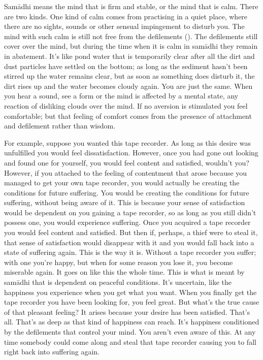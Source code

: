 Sam\=adhi means the mind that is firm and stable, or the mind that is calm. There are two kinds. One kind of calm comes from practising in a quiet place, where there are no sights, sounds or other sensual impingement to disturb you. The mind with such calm is still not free from the defilements (). The defilements still cover over the mind, but during the time when it is calm in sam\=adhi they remain in abatement. It's like pond water that is temporarily clear after all the dirt and dust particles have settled on the bottom; as long as the sediment hasn't been stirred up the water remains clear, but as soon as something does disturb it, the dirt rises up and the water becomes cloudy again. You are just the same. When you hear a sound, see a form or the mind is affected by a mental state, any reaction of disliking clouds over the mind. If no aversion is stimulated you feel comfortable; but that feeling of comfort comes from the presence of attachment and defilement rather than wisdom.

For example, suppose you wanted this tape recorder. As long as this desire was unfulfilled you would feel dissatisfaction. However, once you had gone out looking and found one for yourself, you would feel content and satisfied, wouldn't you? However, if you attached to the feeling of contentment that arose because you managed to get your own tape recorder, you would actually be creating the conditions for future suffering. You would be creating the conditions for future suffering, without being aware of it. This is because your sense of satisfaction would be dependent on you gaining a tape recorder, so as long as you still didn't possess one, you would experience suffering. Once you acquired a tape recorder you would feel content and satisfied. But then if, perhaps, a thief were to steal it, that sense of satisfaction would disappear with it and you would fall back into a state of suffering again. This is the way it is. Without a tape recorder you suffer; with one you're happy, but when for some reason you lose it, you become miserable again. It goes on like this the whole time. This is what is meant by sam\=adhi that is dependent on peaceful conditions. It's uncertain, like the happiness you experience when you get what you want. When you finally get the tape recorder you have been looking for, you feel great. But what's the true cause of that pleasant feeling? It arises because your desire has been satisfied. That's all. That's as deep as that kind of happiness can reach. It's happiness conditioned by the defilements that control your mind. You aren't even aware of this. At any time somebody could come along and steal that tape recorder causing you to fall right back into suffering again.

